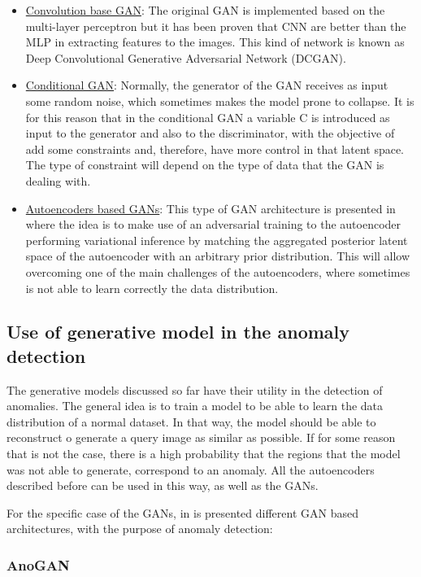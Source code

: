 \begin{itemize}
 \item \underline{Convolution base GAN}: The original GAN is implemented based on the multi-layer perceptron but it has been proven that CNN are better than the MLP in extracting features to the images. This kind of network is known as Deep Convolutional Generative Adversarial Network (DCGAN).
 \item \underline{Conditional GAN}: Normally, the generator of the GAN receives as input some random noise, which sometimes makes the model prone to collapse. It is for this reason that in the conditional GAN a variable C is introduced as input to the generator and also to the discriminator, with the objective of add some constraints and, therefore, have more control in that latent space. The type of constraint will depend on the type of data that the GAN is dealing with.
 \item \underline{Autoencoders based GANs}: This type of GAN architecture is presented in \cite{Makhzani2015} where the idea is to make use of an adversarial training to the autoencoder performing variational inference by matching the aggregated posterior latent space of the autoencoder with an arbitrary prior distribution. This will allow overcoming one of the main challenges of the autoencoders, where sometimes is not able to learn correctly the data distribution.
\end{itemize}

\subsection{Use of generative model in the anomaly detection}

The generative models discussed so far have their utility in the detection of anomalies. The general idea is to train a model to be able to learn the data distribution of a normal dataset. In that way, the model should be able to reconstruct o generate a query image as similar as possible. If for some reason that is not the case, there is a high probability that the regions that the model was not able to generate, correspond to an anomaly. All the autoencoders described before can be used in this way, as well as the GANs.

For the specific case of the GANs, in \cite{DiMattia2019} is presented different GAN based architectures, with the purpose of anomaly detection:

\subsubsection{AnoGAN}

